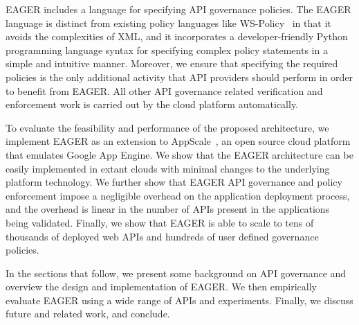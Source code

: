 EAGER includes a language for specifying 
API governance policies.  The EAGER language is distinct from 
existing policy languages like WS-Policy~\cite{WSPolicy,soagovstandard}
in that it avoids the complexities of XML, 
and it incorporates a developer-friendly Python programming language syntax for 
specifying complex policy statements in a simple and 
intuitive manner. Moreover, we ensure that specifying the required policies 
is the only additional activity that API providers should perform in
order to benefit from EAGER. All other API governance related verification and 
enforcement work is carried out by the cloud platform automatically.

To evaluate the feasibility and performance of the proposed 
architecture, we implement EAGER as an extension to AppScale~\cite{appscale13}, 
an open source
cloud platform that emulates Google App Engine. We show that the EAGER 
architecture can be easily implemented in extant clouds with
minimal changes to the underlying platform technology. We further show that 
EAGER API governance and policy enforcement impose a negligible 
overhead on the application deployment process, and the overhead
is linear in the number of APIs present in the applications being validated.  
Finally, we show that EAGER is able to
scale to tens of thousands of deployed web APIs and hundreds of user 
defined governance policies.

In the sections that follow, we present some background on API governance
and overview the design and implementation of
EAGER. We then empirically evaluate EAGER using a wide range of APIs and
experiments.  Finally, we discuss future and related work, and conclude.
